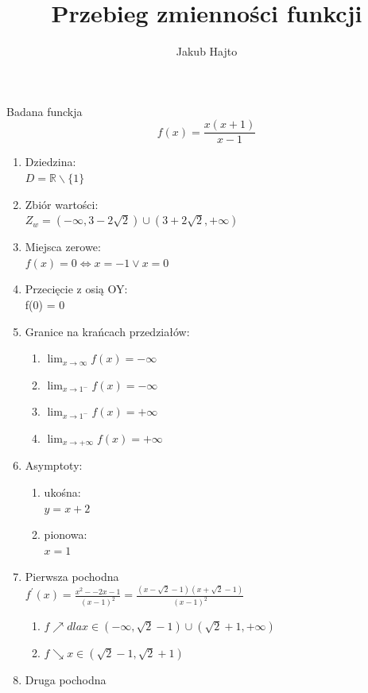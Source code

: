 \documentclass[11pt]{scrartcl}
\title{Przebieg zmienności funkcji}
\author{Jakub Hajto}
\begin{document}
	\maketitle
	\begin{center}
	Badana funckja $$ f(x) = \frac{x(x+1)}{x-1} $$
	\end{center}
	\begin{enumerate}  
		\item Dziedzina: \\
			$ D = \mathbb{R} \backslash \{1\} $
		\item Zbiór wartości: \\
			$ Z_w = (-\infty, 3 - 2\sqrt{2}) \cup (3 + 2\sqrt{2}, + \infty) $
		\item Miejsca zerowe: \\
			$ f(x) = 0 \Longleftrightarrow x = -1 \vee x = 0 $
		\item Przecięcie z osią OY: \\
			f(0) = 0
		\item Granice na krańcach przedziałów:
			\begin{enumerate}
				\item $ \lim_{x\to\infty} f(x) = -\infty $
				\item $ \lim_{x\to1^-} f(x) = -\infty $
				\item $ \lim_{x\to1^-} f(x) = +\infty $
				\item $ \lim_{x\to+\infty} f(x) = +\infty $
			\end{enumerate}
		\item Asymptoty:
			\begin{enumerate}
				\item ukośna: \\
					$ y = x + 2$
				\item pionowa: \\
					$ x=1 $
			\end{enumerate}
		\item Pierwsza pochodna \\
			$ f^{\prime}(x) = \frac{x^2 - -2x -1}{(x-1)^2} =  \frac{(x- \sqrt{2} - 1)(x + \sqrt{2} - 1)}{(x-1)^2} $
			\begin{enumerate}
				\item $ f\nearrow dla x \in (-\infty, \sqrt{2} -1) \cup (\sqrt{2} +1, +\infty) $
				\item $ f\searrow x \in ( \sqrt{2} - 1, \sqrt{2} +1 ) $
			\end{enumerate}
		\item Druga pochodna \\

\end{enumerate}
\end{document}
